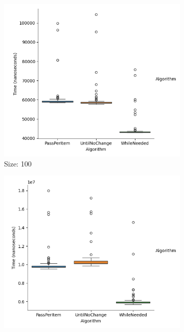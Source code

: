 \documentclass{article}
\begin{document}
\begin{figure}[ht]
  \centering
  \begin{subfigure}{0.3\textwidth}
    \centering
    \includegraphics[width=\linewidth]{../figureByteDesc100.png}
    \caption{Size: 100}
    \label{fig:img1}
  \end{subfigure}
  \begin{subfigure}{0.3\textwidth}
    \centering
    \includegraphics[width=\linewidth]{../figureByteDesc1000.png}

\end{subfigure}
\end{figure}
\end{document}
